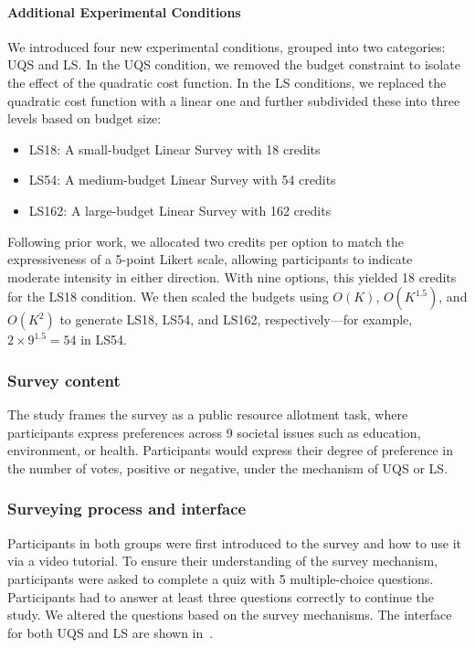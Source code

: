 \paragraph{Additional Experimental Conditions}
We introduced four new experimental conditions, grouped into two categories: UQS and LS. In the UQS condition, we removed the budget constraint to isolate the effect of the quadratic cost function. In the LS conditions, we replaced the quadratic cost function with a linear one and further subdivided these into three levels based on budget size:

\begin{itemize} 
    \item LS18: A small-budget Linear Survey with 18 credits
    \item LS54: A medium-budget Linear Survey with 54 credits
    \item LS162: A large-budget Linear Survey with 162 credits
\end{itemize}

Following prior work, we allocated two credits per option to match the expressiveness of a 5-point Likert scale, allowing participants to indicate moderate intensity in either direction. With nine options, this yielded 18 credits for the LS18 condition. We then scaled the budgets using $O(K)$, $O(K^{1.5})$, and $O(K^2)$ to generate LS18, LS54, and LS162, respectively—for example, $2 \times 9^{1.5} = 54$ in LS54.

\subsubsection{Survey content}
The study frames the survey as a public resource allotment task, where participants express preferences across 9 societal issues such as education, environment, or health. Participants would express their degree of preference in the number of votes, positive or negative, under the mechanism of UQS or LS.

\subsubsection{Surveying process and interface}
Participants in both groups were first introduced to the survey and how to use it via a video tutorial. To ensure their understanding of the survey mechanism, participants were asked to complete a quiz with 5 multiple-choice questions. Participants had to answer at least three questions correctly to continue the study. We altered the questions based on the survey mechanisms. The interface for both UQS and LS are shown in~.

